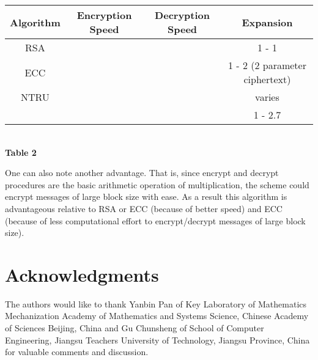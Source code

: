 \documentclass{llncs}
\begin{document}
\begin{center}
\begin{tabular}{|c|c|c|c|}
        \hline
        Algorithm & Encryption Speed & Decryption Speed & Expansion  \\ \hline
        RSA   &  &  & 1 - 1\\ \hline
        ECC  &  &  & 1 - 2 (2 parameter ciphertext)\\ \hline
        NTRU &  &  & varies\\ \hline
         &  &  & 1 - 2.7\\ \hline
    \end{tabular}
\newline \\ \textbf{Table 2} 
\end{center}


One can also note another advantage. That is, since encrypt and
decrypt procedures are the basic arithmetic operation of
multiplication, the scheme could encrypt messages of large block
size with ease. As a result this algorithm is advantageous
relative to RSA or ECC (because of better speed) and ECC (because
of less computational effort to encrypt/decrypt messages of large
block size).

\section*{Acknowledgments}The authors would like to thank Yanbin Pan
of Key Laboratory of Mathematics Mechanization Academy of
Mathematics and Systems Science, Chinese Academy of Sciences
Beijing, China and Gu Chunsheng of School of Computer Engineering,
Jiangsu Teachers University of Technology, Jiangsu Province, China
for valuable comments and discussion.
\end{document}
